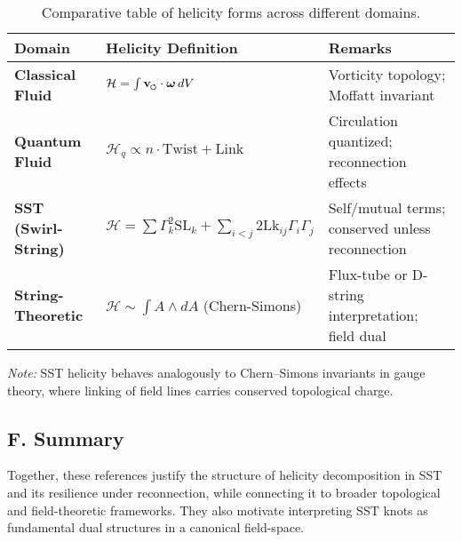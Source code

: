 \documentclass[aps,prb,amsmath,amssymb]{revtex4-2} %
\newcommand{\swirlarrow}{%
    \mathchoice{\mkern-2mu\boldsymbol{\circlearrowleft}}%
    {\mkern-2mu\boldsymbol{\circlearrowleft}}%
    {\mkern-2mu\scriptscriptstyle\boldsymbol{\circlearrowleft}}%
    {\mkern-2mu\scriptscriptstyle\boldsymbol{\circlearrowleft}}%
}
\newcommand{\vswirl}{\mathbf{v}_{\swirlarrow}}                %
\newcommand{\vv}{\vswirl}                                     %
\newcommand{\ww}{\boldsymbol{\omega}}   %
\newcommand{\Hcal}{\mathcal{H}}         %
\newcommand{\SL}{\mathrm{SL}}           %
\newcommand{\Lk}{\mathrm{Lk}}           %
\begin{document}
            \vspace{1em}
            \begin{table}[h]
                \centering
                \footnotesize
                \begin{tabular}{lll}
                    \hline
                    \textbf{Domain} & \textbf{Helicity Definition} & \textbf{Remarks} \\
                    \hline
                    \textbf{Classical Fluid} & $\Hcal = \int \vv \cdot \ww \, dV$ & Vorticity topology; Moffatt invariant \\
                    \textbf{Quantum Fluid} & $\Hcal_q \propto n \cdot \mathrm{Twist} + \mathrm{Link}$ & Circulation quantized; reconnection effects \\
                    \textbf{SST (Swirl-String)} & $\Hcal = \sum \Gamma_k^2 \SL_k + \sum_{i<j} 2\Lk_{ij} \Gamma_i \Gamma_j$ & Self/mutual terms; conserved unless reconnection \\
                    \textbf{String-Theoretic} & $\Hcal \sim \int A \wedge dA$ (Chern-Simons) & Flux-tube or D-string interpretation; field dual \\
                    \hline
                \end{tabular}
                \caption{Comparative table of helicity forms across different domains.}\label{tab:helicity-forms}
            \end{table}


            \vspace{1em}
            \noindent\textit{Note:} SST helicity behaves analogously to Chern–Simons invariants in gauge theory, where linking of field lines carries conserved topological charge.

        \subsection*{F. Summary}
            Together, these references justify the structure of helicity decomposition in SST and its resilience under reconnection, while connecting it to broader topological and field-theoretic frameworks. They also motivate interpreting SST knots as fundamental dual structures in a canonical field-space.
\end{document}
